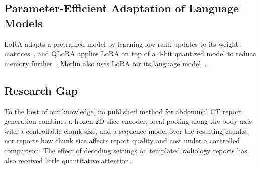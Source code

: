 \documentclass[conference]{IEEEtran}
\begin{document}
\subsection{Parameter-Efficient Adaptation of Language Models}
LoRA adapts a pretrained model by learning low-rank updates to its weight
matrices~\cite{lora}, and QLoRA applies LoRA on top of a 4-bit quantized model
to reduce memory further~\cite{qlora}. Merlin also uses LoRA for its
language model~\cite{merlin}.

\subsection{Research Gap}
To the best of our knowledge, no published method for abdominal CT report
generation combines a frozen 2D slice encoder, local pooling along the body
axis with a controllable chunk size, and a sequence model over the resulting
chunks, nor reports how chunk size affects report quality and cost under a
controlled comparison. The effect of decoding settings on templated
radiology reports has also received little quantitative attention.
\end{document}
